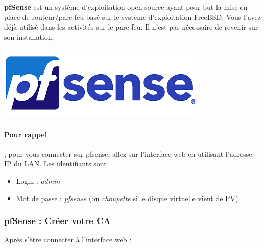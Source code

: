 \documentclass[french, 12pt]{article}%
\newcommand{\itemE}{\item[$\bullet$]}
\begin{document}
\begin{minipage}{0.6\linewidth}
\textbf{pfSense} est un système d'exploitation open source ayant pour but la mise en place de routeur/pare-feu basé sur le système d'exploitation FreeBSD. Vous l'avez déjà utilisé dans les activités sur le pare-feu. Il n'est pas nécessaire de revenir sur son installation; 
\end{minipage}
\begin{minipage}{0.36\linewidth}
\begin{center}
\includegraphics[scale=0.3]{./ressource/fpsenseLogo}
\end{center}
\end{minipage}

\paragraph{Pour rappel}, pour vous connecter sur pfsense, allez sur l'interface web en utilisant l'adresse IP du LAN. Les identifiants sont 
\begin{itemize}
\itemE Login : \textit{admin}
\itemE Mot de passe : \textit{pfsense} (ou \textit{choupette} si le disque virtuelle vient de PV)
\end{itemize}

\subsubsection{pfSense : Créer votre CA}
Après s'être connecter à l'interface web : 
\end{document}

